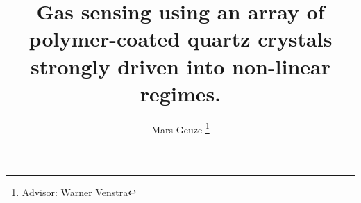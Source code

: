 \documentclass[12pt]{article}
\begin{document}
	\title{Gas sensing using an array of polymer-coated quartz crystals strongly driven into non-linear regimes.}
	\author{Mars Geuze
	\thanks{Advisor: Warner Venstra}}
	\maketitle



\tableofcontents








\end{document}
